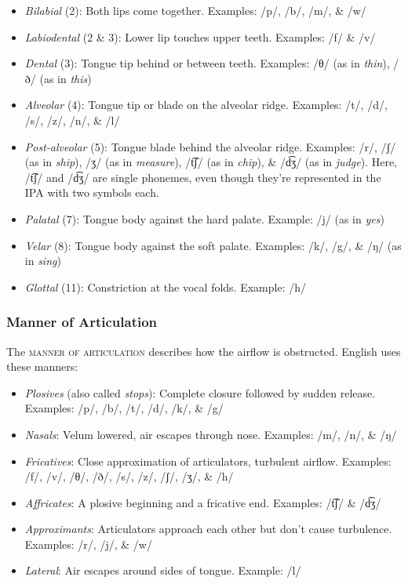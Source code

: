 \begin{itemize}[noitemsep]
    \item \textit{Bilabial} (2): Both lips come together. Examples: /p/, /b/, /m/, \& /w/
    \item \textit{Labiodental} (2 \& 3): Lower lip touches upper teeth. Examples: /f/ \& /v/
    \item \textit{Dental} (3): Tongue tip behind or between teeth. Examples: /θ/ (as in \textit{thin}), /ð/ (as in \textit{this})
    \item \textit{Alveolar} (4): Tongue tip or blade on the alveolar ridge. Examples: /t/, /d/, /s/, /z/, /n/, \& /l/
    \item \textit{Post-alveolar} (5): Tongue blade behind the alveolar ridge. Examples: /r/, /ʃ/ (as in \textit{ship}), /ʒ/ (as in \textit{measure}), /t͡ʃ/ (as in \textit{chip}), \& /d͡ʒ/ (as in \textit{judge}). Here, /t͡ʃ/ and /d͡ʒ/ are single phonemes, even though they're represented in the IPA with two symbols each.
    \item \textit{Palatal} (7): Tongue body against the hard palate. Example: /j/ (as in \textit{yes})
    \item \textit{Velar} (8): Tongue body against the soft palate. Examples: /k/, /g/, \& /ŋ/ (as in \textit{sing})
    \item \textit{Glottal} (11): Constriction at the vocal folds. Example: /h/
\end{itemize}

\subsubsection{Manner of Articulation}

The \textsc{manner of articulation} describes how the airflow is obstructed. English uses these manners:

\begin{itemize}[noitemsep]
    \item \textit{Plosives} (also called \textit{stops}): Complete closure followed by sudden release. Examples: /p/, /b/, /t/, /d/, /k/, \& /g/
    \item \textit{Nasals}: Velum lowered, air escapes through nose. Examples: /m/, /n/, \& /ŋ/
    \item \textit{Fricatives}: Close approximation of articulators, turbulent airflow. Examples: /f/, /v/, /θ/, /ð/, /s/, /z/, /ʃ/, /ʒ/, \& /h/
    \item \textit{Affricates}: A plosive beginning and a fricative end. Examples: /t͡ʃ/ \& /d͡ʒ/
    \item \textit{Approximants}: Articulators approach each other but don't cause turbulence. Examples: /r/, /j/, \& /w/
    \item \textit{Lateral}: Air escapes around sides of tongue. Example: /l/
\end{itemize}

